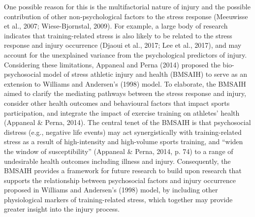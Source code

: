 \documentclass[man,floatsintext]{apa6}
\begin{document}
One possible reason for this is the multifactorial nature of injury and the possible contribution of other non-psychological factors to the stress response
(Meeuwisse et al., 2007; Wiese-Bjornstal, 2009).
For example, a large body of research indicates that training-related stress is also likely to be related to the stress response and injury occurrence (Djaoui et al., 2017; Lee et al., 2017),
and may account for the unexplained variance from the psychological predictors of injury.
Considering these limitations, Appaneal and Perna (2014)
proposed the bio-psychosocial model of stress athletic injury and health (BMSAIH) to serve as an extension to Williams and Andersen's (1998) model.
To elaborate, the BMSAIH aimed to clarify the mediating pathways between the stress response and injury,
consider other health outcomes and behavioural factors that impact sports participation,
and integrate the impact of exercise training on athletes' health (Appaneal \& Perna, 2014).
The central tenet of the BMSAIH is that psychosocial distress (e.g., negative life events) may act synergistically with training-related stress as a result of high-intensity and high-volume sports training, and \enquote{widen the window of susceptibility} (Appaneal \& Perna, 2014, p. 74) to a range of undesirable health outcomes including illness and injury.
Consequently, the BMSAIH provides a framework for future research to build upon research that supports the relationship between psychosocial factors and injury occurrence proposed in Williams and Andersen's (1998) model, by including other physiological markers of training-related stress, which together may provide greater insight into the injury process.
\end{document}
